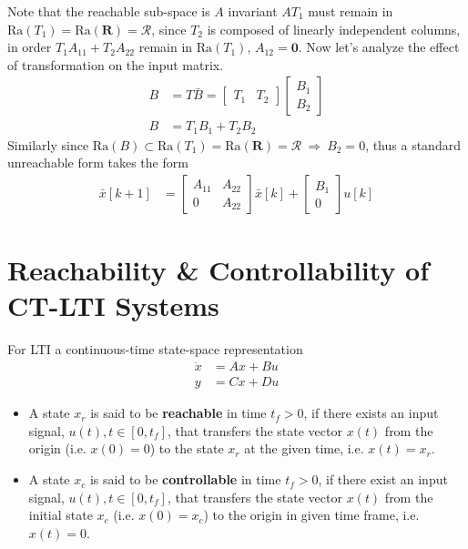 \documentclass[twoside]{article}
\begin{document}
%
Note that the reachable sub-space is $A$ invariant $A T_1$ must remain in $\mathrm{Ra}(T_1) = \mathrm{Ra}(\mathbf{R}) = \mathcal{R}$,
since $T_2$ is composed of linearly independent columns, in order $T_1 A_{11} + T_2 A_{22}$ remain in $\mathrm{Ra}(T_1)$, $A_{12} = \mathbf{0}$.
Now let's analyze the effect of transformation on the input matrix.
%
\begin{align*}
    B &= T \bar{B} = \left[ \begin{array}{c|c} T_1 & T_2  \end{array} \right] \left[ \begin{array}{c} B_1 \\ B_2  \end{array} \right]
    \\
    B &= T_1 B_1 + T_2 B_2
\end{align*}
%
Similarly since $\mathrm{Ra}(B) \subset \mathrm{Ra}(T_1) = \mathrm{Ra}(\mathbf{R}) = \mathcal{R} \ \Rightarrow \ B_2 = 0$, thus a standard unreachable form takes the form
%
\begin{align*}
\bar{x}[k+1] &= \left[ \begin{array}{c|c} A_{11} & A_{22} \\ \hline 0 & A_{22}  \end{array} \right] \bar{x}[k]
+ \left[ \begin{array}{c} B_1 \\ 0 \end{array} \right] u[k]
\end{align*}

\newpage

\section{Reachability \& Controllability of CT-LTI Systems}

For LTI a continuous-time state-space representation
%
\begin{align*}
  \dot{x} &= A x + B u
\\
  y &= C x + D u
\end{align*}
%
\begin{itemize}
  \item A state $x_r$ is said to be \textbf{reachable} in time $t_f > 0$, if there exists
  an input signal, $u(t) , t \in [ 0 , t_f ]$, that transfers the state vector 
  $x(t)$ from the origin (i.e. $x(0) = 0$) to the state $x_r$ at the given time, 
   i.e. $x(t) = x_r$.
 
  \item A state $x_c$ is said to be \textbf{controllable} in time $t_f > 0$,
  if there exist an input signal, $u(t) , t \in [0 , t_f] $, that transfers the state vector 
  $x(t)$ from the initial state $x_c$ (i.e. $x(0) = x_c$) to the origin
  in given time frame, i.e. $x(t) = 0$.
\end{itemize}
\end{document}
